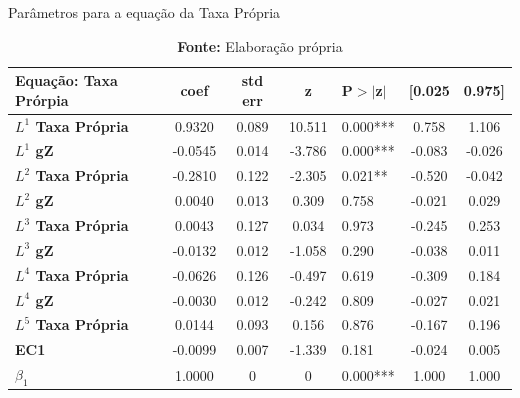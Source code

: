 \begin{center}
	\begin{table}[htb]
		\centering
		\caption{Parâmetros para a equação da Taxa Própria}
	\begin{tabular}{lccclcc}
		\toprule
		\textbf{Equação:} Taxa Prórpia & \textbf{coef} & \textbf{std err} & \textbf{z} & \textbf{P$> |$z$|$} & \textbf{[0.025} & \textbf{0.975]}  \\
		\midrule
		\textbf{$L^1 $ Taxa Própria} &       0.9320  &        0.089     &    10.511  &         0.000***        &        0.758    &        1.106     \\
		\textbf{$L^1 $ gZ}           &      -0.0545  &        0.014     &    -3.786  &         0.000***        &       -0.083    &       -0.026     \\
		\textbf{$L^2 $ Taxa Própria} &      -0.2810  &        0.122     &    -2.305  &         0.021**        &       -0.520    &       -0.042     \\
		\textbf{$L^2 $ gZ}           &       0.0040  &        0.013     &     0.309  &         0.758        &       -0.021    &        0.029     \\
		\textbf{$L^3 $ Taxa Própria} &       0.0043  &        0.127     &     0.034  &         0.973        &       -0.245    &        0.253     \\
		\textbf{$L^3 $ gZ}           &      -0.0132  &        0.012     &    -1.058  &         0.290        &       -0.038    &        0.011     \\
		\textbf{$L^4 $ Taxa Própria} &      -0.0626  &        0.126     &    -0.497  &         0.619        &       -0.309    &        0.184     \\
		\textbf{$L^4 $ gZ}           &      -0.0030  &        0.012     &    -0.242  &         0.809        &       -0.027    &        0.021     \\
		\textbf{$L^5 $ Taxa Própria} &       0.0144  &        0.093     &     0.156  &         0.876        &       -0.167    &        0.196     \\
		\textbf{EC1} &      -0.0099  &        0.007     &    -1.339  &         0.181        &       -0.024    &        0.005     \\
		\textbf{$\beta_1$ } &       1.0000  &            0     &         0  &         0.000***        &        1.000    &        1.000     \\\bottomrule
	\end{tabular}
\caption*{\textbf{Fonte:} Elaboração própria}
\end{table}
\end{center}
	
